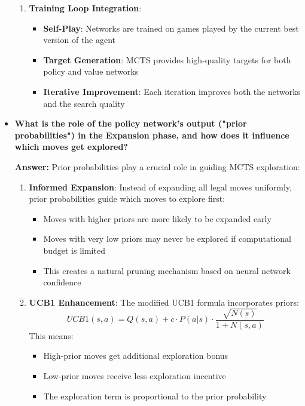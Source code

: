 \begin{itemize}
\begin{enumerate}
        \item \textbf{Training Loop Integration}:
        \begin{itemize}
            \item \textbf{Self-Play}: Networks are trained on games played by the current best version of the agent
            \item \textbf{Target Generation}: MCTS provides high-quality targets for both policy and value networks
            \item \textbf{Iterative Improvement}: Each iteration improves both the networks and the search quality
        \end{itemize}
    \end{enumerate}
    
    \item \textbf{What is the role of the policy network's output ("prior probabilities") in the Expansion phase, and how does it influence which moves get explored?}
    
    \textbf{Answer:} Prior probabilities play a crucial role in guiding MCTS exploration:
    
    \begin{enumerate}
        \item \textbf{Informed Expansion}: Instead of expanding all legal moves uniformly, prior probabilities guide which moves to explore first:
        \begin{itemize}
            \item Moves with higher priors are more likely to be expanded early
            \item Moves with very low priors may never be explored if computational budget is limited
            \item This creates a natural pruning mechanism based on neural network confidence
        \end{itemize}
        
        \item \textbf{UCB1 Enhancement}: The modified UCB1 formula incorporates priors:
        \[UCB1(s,a) = Q(s,a) + c \cdot P(a|s) \cdot \frac{\sqrt{N(s)}}{1 + N(s,a)}\]
        This means:
        \begin{itemize}
            \item High-prior moves get additional exploration bonus
            \item Low-prior moves receive less exploration incentive
            \item The exploration term is proportional to the prior probability
        \end{itemize}
        

\end{enumerate}
\end{itemize}
